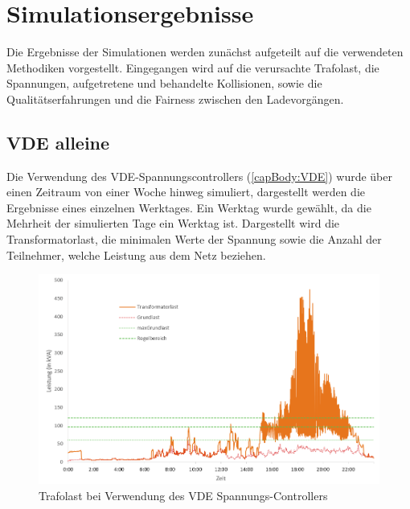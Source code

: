 \section{Simulationsergebnisse}
Die Ergebnisse der Simulationen werden zunächst aufgeteilt auf die verwendeten Methodiken vorgestellt. Eingegangen wird auf die verursachte Trafolast, die Spannungen, aufgetretene und behandelte Kollisionen, sowie die Qualitätserfahrungen und die Fairness zwischen den Ladevorgängen. 
\subsection{VDE alleine}
Die Verwendung des VDE-Spannungscontrollers (\ref{capBody:VDE}) wurde über einen Zeitraum von einer Woche hinweg simuliert, dargestellt werden die Ergebnisse eines einzelnen Werktages. Ein Werktag wurde gewählt, da die Mehrheit der simulierten Tage ein Werktag ist. Dargestellt wird die Transformatorlast, die minimalen Werte der Spannung sowie die Anzahl der Teilnehmer, welche Leistung aus dem Netz beziehen. 
\begin{figure}[htb]
\centering
	\includegraphics[scale=0.7]{img/VDE_tau/TrafoLast7.png}
	\caption{Trafolast bei Verwendung des VDE Spannungs-Controllers}
	\label{Abb_VDEtauTrafoLast}
\end{figure}

